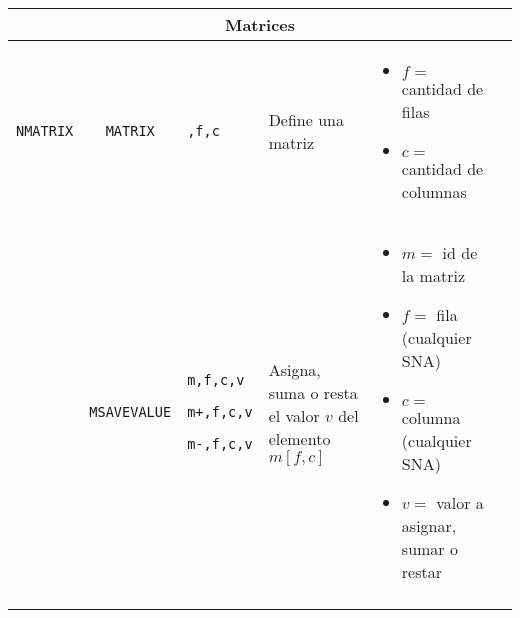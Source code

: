 \documentclass{article}
\providecommand{\tabularnewline}{\\}
\begin{document}
\begin{longtable}{|lc>{\raggedright}p{}|>{\raggedright}p{}|>{\raggedright}p{}|>{\raggedright}p{}|}
\hline
\multicolumn{6}{c}{\textbf{Matrices}} \tabularnewline

\hline
\texttt{NMATRIX} & \texttt{MATRIX} & \texttt{,f,c} &
Define una matriz &
\begin{itemize}
  \item $f=$ cantidad de filas
  \item $c=$ cantidad de columnas
\end{itemize} & \tabularnewline

\hline
& \texttt{MSAVEVALUE} & \texttt{m,f,c,v}

\texttt{m+,f,c,v}

\texttt{m-,f,c,v} &
Asigna, suma o resta el valor $v$ del elemento $m[f,c]$ &
\begin{itemize}
  \item $m=$ id de la matriz
  \item $f=$ fila (cualquier SNA)
  \item $c=$ columna (cualquier SNA)
  \item $v=$ valor a asignar, sumar o restar
\end{itemize} & \tabularnewline

\hline
\pagebreak


\end{longtable}
\end{document}
